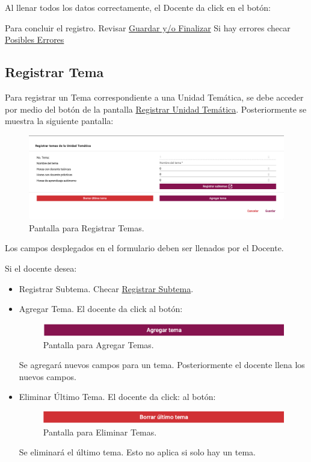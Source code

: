 Al llenar todos los datos correctamente, el Docente da click en el botón:

Para concluir el registro. Revisar \hyperlink{GuardarFinalizar}{Guardar y/o Finalizar}
Si hay errores checar \hyperlink{Errores}{Posibles Errores}


\pagebreak

\hypertarget{RegistrarTema}{\subsection{Registrar Tema}}
Para registrar un Tema correspondiente a una Unidad Temática, se debe acceder por medio del botón  de la pantalla \hyperlink{RUT}{Registrar Unidad Temática}. Posteriormente se muestra la siguiente pantalla:

\hypertarget{RTema}{}
\begin{figure}[!hbtp]
    \centering
    \includegraphics[width=0.7\linewidth]{images/SP6/RegistrarTema.png}
    \caption{Pantalla para Registrar Temas.} 
\end{figure}

Los campos desplegados en el formulario deben ser llenados por el Docente.

Si el docente desea:
\begin{itemize}
    \item Registrar Subtema. Checar \hyperlink{RegistrarSubtema}{Registrar Subtema}.
    \item Agregar Tema. El docente da click al botón:
    \begin{figure}[!hbtp]
    \centering
    \includegraphics[width=0.4\linewidth]{images/SP6/AgregarTema.png}
    \caption{Pantalla para Agregar Temas.} 
    \end{figure}
    Se agregará nuevos campos para un tema. Posteriormente el docente llena los nuevos campos.
    \item Eliminar Último Tema. El docente da click: al botón:
    \begin{figure}[!hbtp]
    \centering
    \includegraphics[width=0.4\linewidth]{images/SP6/EliminarTema.png}
    \caption{Pantalla para Eliminar Temas.} 
    \end{figure}
    Se eliminará el último tema. Esto no aplica si solo hay un tema.
\end{itemize}

